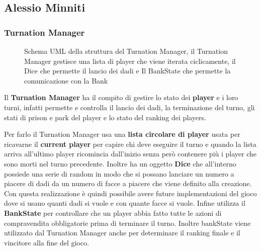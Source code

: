 \subsection{Alessio Minniti}
\subsubsection{Turnation Manager}
\begin{figure}[H]
    \centering
    \caption{Schema UML della struttura del Turnation Manager, il Turnation Manager gestisce una lista di player che viene iterata ciclicamente, 
    il Dice che permette il lancio dei dadi e Il BankState che permette la comunicazione con la Bank }
	\label{img:Turnation}
\end{figure}

Il \textbf{Turnation Manager} ha il compito di gestire lo stato dei \textbf{player} e i loro turni, 
infatti permette e controlla il lancio dei dadi, la terminazione del turno, gli stati di prison e park del player e lo stato del ranking dei players.\newline

Per farlo il Turnation Manager usa una \textbf{lista circolare di player} usata per ricavarne il \textbf{current player} per capire chi deve eseguire il turno e
quando la lista arriva all'ultimo player ricomincia dall'inizio senza però contenere più i player che sono morti nel turno precedente.\newline
Inoltre ha un oggetto \textbf{Dice} che all'interno possiede una serie di random in modo che si possano lanciare 
un numero a piacere di dadi da un numero di facce a piacere che viene definito alla creazione. Con questa realizzazione è quindi possibile avere future implementazioni del gioco
dove si usano quanti dadi si vuole e con quante facce si vuole.\newline
Infine utilizza il \textbf{BankState} per controllare che un player abbia fatto tutte le azioni di compravendita obbligatorie prima di terminare il turno.
Inoltre bankState viene utilizzato dal Turnation Manager anche per determinare il ranking finale e il vincitore alla fine del gioco.

